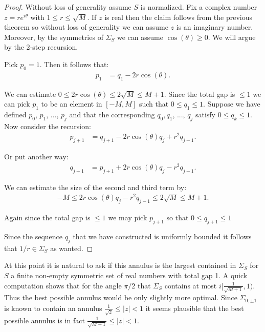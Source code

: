 \documentclass[11pt]{amsart}
\numberwithin{theorem}{section} %
\numberwithin{corollary}{section}
\numberwithin{lemma}{section}
\numberwithin{proposition}{section}
\numberwithin{definition}{section}
\begin{document}
\begin{proof}
Without loss of generality assume $S$ is normalized. Fix a complex number $z = re^{i\theta}$ with $1 \leqslant r \leqslant \sqrt{M}$. If $z$ is real then the claim follows from the previous theorem so without loss of generality we can assume $z$ is an imaginary number. Moreover, by the symmetries of $\Sigma_S$ we can assume $\cos(\theta) \geqslant 0$. We will argue by the 2-step recursion.

Pick $p_0 = 1$. Then it follows that:
\begin{align*}
p_1 &= q_1 - 2r \cos(\theta).
\end{align*}

We can estimate $0 \leqslant 2r\cos(\theta) \leqslant 2\sqrt{M} \leqslant M+1$.
Since the total gap is $\leqslant 1$ we can pick $p_1$ to be an element in $[-M, M]$ such that $0 \leqslant q_1 \leqslant 1$. Suppose we have defined $p_0$, $p_1$, ..., $p_j$ and that the corresponding $q_0, q_1$, ..., $q_j$ satisfy $0 \leqslant q_k \leqslant 1$.
Now consider the recursion:
\begin{align*}
p_{j+1} &= q_{j+1} - 2r\cos(\theta)q_{j} + r^2q_{j-1}.
\end{align*}
 
 Or put another way:
 \begin{align*}
 q_{j+1} &= p_{j+1} + 2r \cos(\theta)q_j - r^2 q_{j-1}.
 \end{align*}
 
 We can estimate the size of the second and third term by:
 \begin{align*}
 -M \leqslant 2r\cos(\theta)q_j - r^2q_{j-1} \leqslant 2\sqrt{M} \leqslant M+1.
 \end{align*}

Again since the total gap is $\leqslant 1$ we may pick $p_{j+1}$ so that $0 \leqslant q_{j+1} \leqslant 1$

Since the sequence $q_j$ that we have constructed is uniformly bounded it follows that $1/r \in \Sigma_S$ as wanted.
\end{proof}

At this point it is natural to ask if this annulus is the largest contained in $\Sigma_S$ for $S$ a finite non-empty symmetric set of real numbers with total gap 1. A quick computation shows that for the angle $\pi/2$ that $\Sigma_S$ contains at most $i[\frac{1}{\sqrt{M+1}}, 1)$. Thus the best possible annulus would be only slightly more optimal. Since $\Sigma_{0, \pm 1}$ is known to contain an annulus $\frac{1}{\sqrt{2}} \leqslant |z| < 1$ it seems plausible that the best possible annulus is in fact $\frac{1}{\sqrt{M+1}} \leqslant |z| < 1$.
\end{document}

